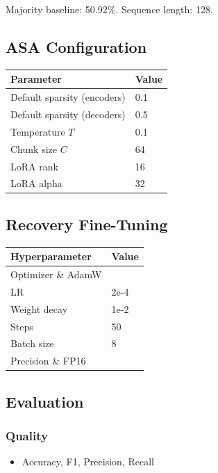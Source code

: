 Majority baseline: 50.92\%. Sequence length: 128.

\subsection{ASA Configuration}

\begin{table}[H]
\centering
\small
\begin{tabular}{ll}
\toprule
\textbf{Parameter} & \textbf{Value} \\
\midrule
Default sparsity (encoders) & 0.1 \\
Default sparsity (decoders) & 0.5 \\
Temperature $T$ & 0.1 \\
Chunk size $C$ & 64 \\
LoRA rank & 16 \\
LoRA alpha & 32 \\
\bottomrule
\end{tabular}
\end{table}

\subsection{Recovery Fine-Tuning}

\begin{table}[H]
\centering
\small
\begin{tabular}{ll}
\toprule
\textbf{Hyperparameter} & \textbf{Value} \\
\midrule
Optimizer \& AdamW \\
LR & 2e-4 \\
Weight decay & 1e-2 \\
Steps & 50 \\
Batch size & 8 \\
Precision \& FP16 \\
\bottomrule
\end{tabular}
\end{table}

\subsection{Evaluation}

\subsubsection{Quality}
\begin{itemize}
\item Accuracy, F1, Precision, Recall

\end{itemize}
